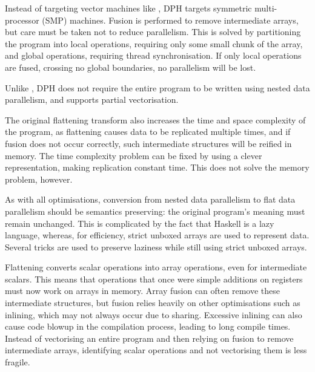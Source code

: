 Instead of targeting vector machines like \nesl, DPH targets symmetric multi-processor (SMP) machines.
Fusion is performed to remove intermediate arrays, but care must be taken not to reduce parallelism\cite{chakravarty1999portable}.
This is solved by partitioning the program into local operations,
requiring only some small chunk of the array,
and global operations, requiring thread synchronisation\cite{keller1999distributed}.
If only local operations are fused, crossing no global boundaries, no parallelism will be lost.

Unlike \nesl, DPH does not require the entire program to be written using nested data parallelism,
and supports partial vectorisation\cite{chakravarty2008partial}.

The original flattening transform also increases the time and space complexity of the program,
as flattening causes data to be replicated multiple times,
and if fusion does not occur correctly, such intermediate structures will be reified in memory.
The time complexity problem can be fixed by using a clever representation, making replication constant time\cite{lippmeier2012work}.
This does not solve the memory problem, however.

As with all optimisations, conversion from nested data parallelism to flat data parallelism should be semantics preserving:
the original program's meaning must remain unchanged\cite{leshchinskiy2005higher}.
This is complicated by the fact that Haskell is a lazy language, whereas, for efficiency, strict unboxed arrays are used to represent data.
Several tricks are used to preserve laziness while still using strict unboxed arrays.

Flattening converts scalar operations into array operations, even for intermediate scalars\cite{keller2012vectorisation}.
This means that operations that once were simple additions on registers must now work on arrays in memory.
Array fusion can often remove these intermediate structures, but fusion relies heavily on other optimisations such as inlining,
which may not always occur due to sharing. Excessive inlining can also cause code blowup in the compilation process,
leading to long compile times.
Instead of vectorising an entire program and then relying on fusion to remove intermediate arrays,
identifying scalar operations and not vectorising them is less fragile.




